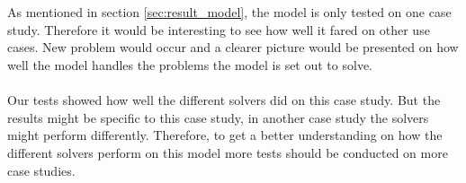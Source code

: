 \\\\
As mentioned in section \ref{sec:result_model}, the model is only tested on one case study. Therefore it would be interesting to see how well it fared on other use cases. New problem would occur and a clearer picture would be presented on how well the model handles the problems the model is set out to solve.
\\\\
Our tests showed how well the different solvers did on this case study. But the results might be specific to this case study, in another case study the solvers might perform differently. Therefore, to get a better understanding on how the different solvers perform on this model more tests should be conducted on more case studies.